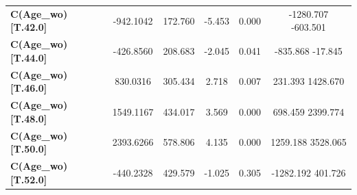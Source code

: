 \begin{subappendices}
\begin{table}[H]
{\begin{tabular}{lccccc}
\textbf{C(Age_wo)[T.42.0]}                                           &    -942.1042  &      172.760     &    -5.453  &         0.000        &     -1280.707  -603.501       \\
\textbf{C(Age_wo)[T.44.0]}                                           &    -426.8560  &      208.683     &    -2.045  &         0.041        &      -835.868   -17.845       \\
\textbf{C(Age_wo)[T.46.0]}                                           &     830.0316  &      305.434     &     2.718  &         0.007        &       231.393  1428.670       \\
\textbf{C(Age_wo)[T.48.0]}                                           &    1549.1167  &      434.017     &     3.569  &         0.000        &       698.459  2399.774       \\
\textbf{C(Age_wo)[T.50.0]}                                           &    2393.6266  &      578.806     &     4.135  &         0.000        &      1259.188  3528.065       \\
\textbf{C(Age_wo)[T.52.0]}                                           &    -440.2328  &      429.579     &    -1.025  &         0.305        &     -1282.192   401.726       \\

\end{tabular}}
\end{table}
\end{subappendices}

